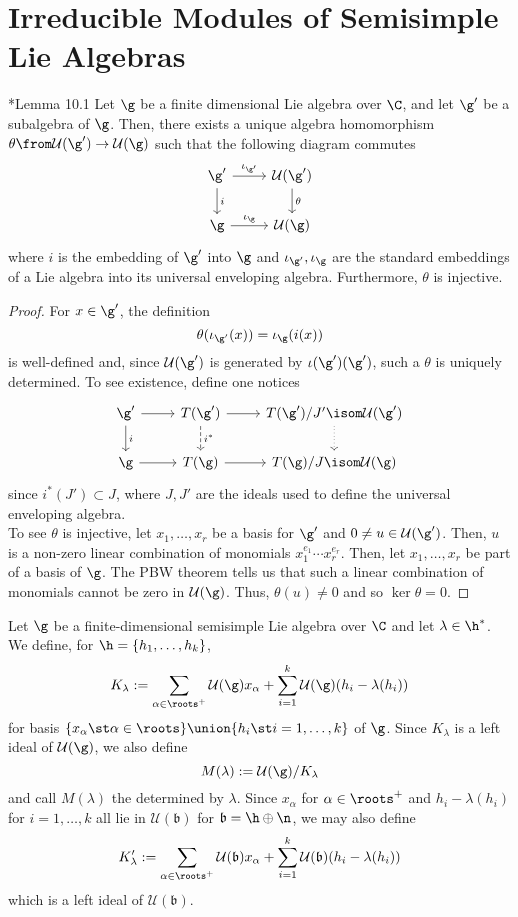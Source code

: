 \documentclass[11pt,leqno,oneside]{amsart}
\numberwithin{thm}{section}
\newcommand{\U}{\mathcal{U}}
\renewcommand{\b}{\mathfrak{b}}
\begin{document}
\section{Irreducible Modules of Semisimple Lie Algebras}
\begin{lem}
  \cite{carter}*{Lemma 10.1} Let \(\g\) be a finite dimensional Lie algebra over \(\C\), and let
  \(\g'\) be a subalgebra of \(\g\). Then, there exists a unique
  algebra homomorphism \(\theta \from \U(\g') \to \U(\g)\) such that the
  following diagram commutes \[
    \begin{tikzcd}
      \g' \ar[d, "i"] \ar[r, "\iota_{\g'}"] & \U(\g') \ar[d, "\theta"] \\
      \g \ar[r,"\iota_{\g}"] & \U(\g)
    \end{tikzcd}
  \]
  where \(i\) is the embedding of \(\g'\) into \(\g\) and
  \(\iota_{\g'}, \iota_\g\) are the standard embeddings of a Lie
  algebra into its universal enveloping algebra. Furthermore, \(\theta\)
  is injective.
\end{lem}
\begin{proof}
  For \(x \in \g'\), the definition \[
    \theta(\iota_{\g'}(x)) = \iota_\g(i(x))
  \]
  is well-defined and, since \(\U(\g')\) is generated by
  \(\iota(\g')(\g')\), such a \(\theta\) is uniquely determined. To
  see existence, define one notices \[
    \begin{tikzcd}
      \g' \ar[r] \ar[d, "i"]& T(\g') \ar[d, dashed, "i^*"] \ar[r] & T(\g')/J'
      \isom \U(\g') \ar[d, dotted] \\
      \g \ar[r] & T(\g) \ar[r] & T(\g)/J \isom \U(\g)
    \end{tikzcd}
  \]
  since \(i^*(J') \subset J\), where \(J,J'\) are the ideals used to
  define the universal enveloping algebra. \\

  To see \(\theta\) is injective, let \(x_1, \ldots, x_r\) be a basis
  for \(\g'\) and \(0 \neq u \in \U(\g')\). Then, \(u\) is a non-zero
  linear combination of monomials 
  \(x_1^{e_1} \cdots x_r^{e_r}\). Then, let \(x_1, \ldots, x_r\) be
  part of a basis of \(\g\). The PBW theorem tells us that such a
  linear combination of monomials cannot be zero in \(\U(\g)\). Thus,
  \(\theta(u) \neq 0\) and so \(\ker \theta = 0\). 
\end{proof}
\begin{defn}
  Let \(\g\) be a finite-dimensional semisimple Lie algebra over
  \(\C\) and let \(\lambda \in \h^*\). We define, for \(\h = \{h_1,
  \ldots, h_k\}\),  \[
    K_\lambda := \sum_{\alpha \in \roots^+} \U(\g) x_\alpha +
    \sum_{i=1}^k \U(\g)(h_i - \lambda(h_i))
  \]
  for basis \(\{x_\alpha \st \alpha \in \roots\} \union \{h_i \st i =
  1, \ldots, k\}\) of \(\g\). Since \(K_\lambda\) is a left ideal of
  \(\U(\g)\), we also define \[
    M(\lambda) := \U(\g)/K_\lambda
  \]
  and call \(M(\lambda)\) the  determined by
  \(\lambda\). Since \(x_\alpha\) for \(\alpha \in \roots^+\) and
  \(h_i-\lambda(h_i)\) for \(i=1,\ldots,k\) all lie in \(\U(\b)\) for
  \(\b = \h\oplus\n\), we may also define \[
    K_\lambda':= \sum_{\alpha \in \roots^+} \U(\b) x_\alpha +
    \sum_{i=1}^k \U(\b)(h_i - \lambda(h_i))
  \]
  which is a left ideal of \(\U(\b)\).
\end{defn}
\end{document}
